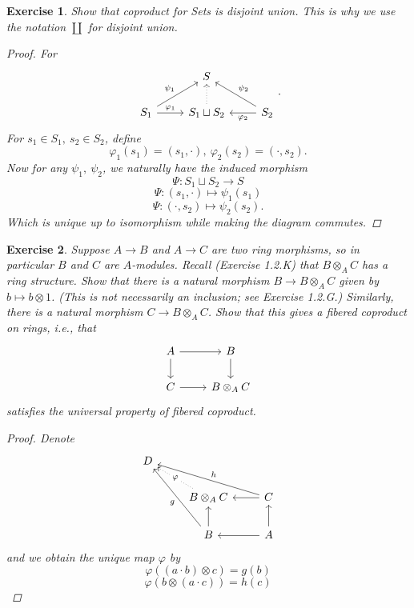 \documentclass{article}
\theoremstyle{breakstyle}
\newtheorem{exercise}{Exercise}[section]
\begin{document}
\begin{exercise}
Show that coproduct for Sets is disjoint union. This is why we use the
notation $\coprod$ for disjoint union.

\begin{proof}
	For
	$$
	\begin{tikzcd}
                                                & S                                                       &                                                  \\
S_1 \arrow[r, "\varphi_1"] \arrow[ru, "\psi_1"] & S_1\sqcup S_2 \arrow[u, dotted] & S_2 \arrow[l, "\varphi_2"] \arrow[lu, "\psi_2"']
	\end{tikzcd}
	.$$ 
	For $s_1\in S_1,\ s_2\in S_2$, define
	$$
	\varphi_1(s_1)=(s_1,\cdot ),\ \varphi_2(s_2)=(\cdot ,s_2)
	.$$
	Now for any $\psi_1,\ \psi_2$, we naturally have the induced morphism
	$$
	\Psi :S_1\sqcup S_2\longrightarrow S
	$$ 
	$$
	\Psi:(s_1,\cdot )\longmapsto \psi_1(s_1)
	$$ 
	$$
	\Psi:(\cdot ,s_2)\longmapsto \psi_2(s_2)
	.$$
	Which is unique up to isomorphism while making the diagram commutes.
\end{proof}

\end{exercise}

\begin{exercise}
Suppose $A \to B$ and $A \to C$ are two ring morphisms, so in particular $B$
and $C$ are $A$-modules. Recall (Exercise 1.2.K) that $B \otimes_A C$ has a
ring structure. Show that there is a natural morphism $B \to B \otimes_A C$
given by $b \mapsto b \otimes 1$. (This is not necessarily an inclusion; see
Exercise 1.2.G.) Similarly, there is a natural morphism $C \to B \otimes_A
C$. Show that this gives a fibered coproduct on rings, i.e., that
$$
\begin{tikzcd}
    A \arrow[r] \arrow[d] & B \arrow[d] \\
    C \arrow[r] & B \otimes_A C
\end{tikzcd}
$$
satisfies the universal property of fibered coproduct.

\begin{proof}
	Denote
	$$
	\begin{tikzcd}
D &                                                       &                               \\
  & B\otimes_AC \arrow[lu, "\varphi" description, dotted] & C \arrow[l] \arrow[llu, "h"'] \\
  & B \arrow[u] \arrow[luu, "g"]                          & A \arrow[l] \arrow[u]        
	\end{tikzcd}
	$$ 
	and we obtain the unique map $\varphi$ by
	$$
	\varphi((a\cdot b)\otimes c)=g(b)
	$$ 
	$$
	\varphi(b\otimes (a\cdot c))=h(c)
	$$ 
\end{proof}

\end{exercise}
\end{document}
